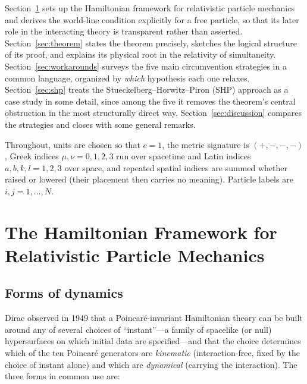 \documentclass[11pt]{article}
\begin{document}
Section~\ref{sec:framework} sets up the Hamiltonian framework for relativistic particle mechanics and derives the world-line condition explicitly for a free particle, so that its later role in the interacting theory is transparent rather than asserted. Section~\ref{sec:theorem} states the theorem precisely, sketches the logical structure of its proof, and explains its physical root in the relativity of simultaneity. Section~\ref{sec:workarounds} surveys the five main circumvention strategies in a common language, organized by \emph{which} hypothesis each one relaxes. Section~\ref{sec:shp} treats the Stueckelberg--Horwitz--Piron (SHP) approach as a case study in some detail, since among the five it removes the theorem's central obstruction in the most structurally direct way. Section~\ref{sec:discussion} compares the strategies and closes with some general remarks.

Throughout, units are chosen so that $c=1$, the metric signature is $(+,-,-,-)$, Greek indices $\mu,\nu=0,1,2,3$ run over spacetime and Latin indices $a,b,k,l=1,2,3$ over space, and repeated spatial indices are summed whether raised or lowered (their placement then carries no meaning). Particle labels are $i,j=1,\dots,N$.

\section{The Hamiltonian Framework for Relativistic Particle Mechanics}
\label{sec:framework}

\subsection{Forms of dynamics}

Dirac observed in 1949 \cite{Dirac1949} that a Poincar\'e-invariant Hamiltonian theory can be built around any of several choices of ``instant''---a family of spacelike (or null) hypersurfaces on which initial data are specified---and that the choice determines which of the ten Poincar\'e generators are \emph{kinematic} (interaction-free, fixed by the choice of instant alone) and which are \emph{dynamical} (carrying the interaction). The three forms in common use are:
\end{document}
